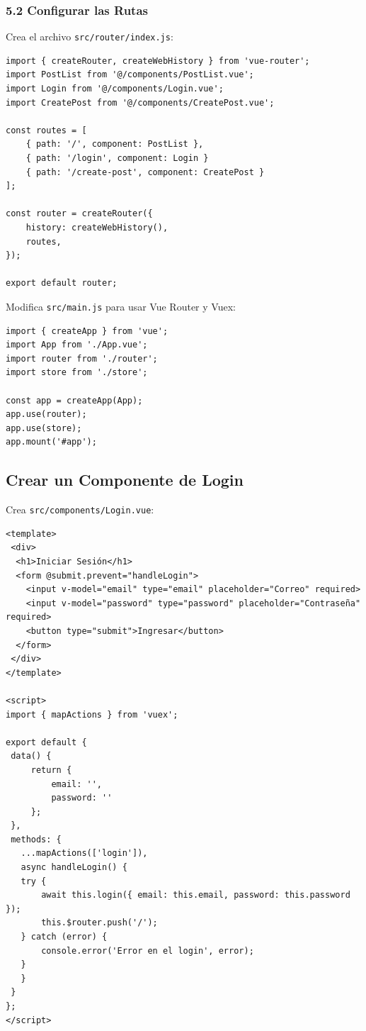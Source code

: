 \documentclass[11pt]{article}
\begin{document}
\subsubsection{5.2 Configurar las Rutas}
\label{sec:org251d928}
Crea el archivo \texttt{src/router/index.js}:

\begin{verbatim}
import { createRouter, createWebHistory } from 'vue-router';
import PostList from '@/components/PostList.vue';
import Login from '@/components/Login.vue';
import CreatePost from '@/components/CreatePost.vue';

const routes = [
    { path: '/', component: PostList },
    { path: '/login', component: Login }
    { path: '/create-post', component: CreatePost }
];

const router = createRouter({
    history: createWebHistory(),
    routes,
});

export default router;
\end{verbatim}

Modifica \texttt{src/main.js} para usar Vue Router y Vuex:

\begin{verbatim}
import { createApp } from 'vue';
import App from './App.vue';
import router from './router';
import store from './store';

const app = createApp(App);
app.use(router);
app.use(store);
app.mount('#app');
\end{verbatim}

\subsection{Crear un Componente de Login}
\label{sec:org200732a}

Crea \texttt{src/components/Login.vue}:

\begin{verbatim}
<template>
 <div>
  <h1>Iniciar Sesión</h1>
  <form @submit.prevent="handleLogin">
    <input v-model="email" type="email" placeholder="Correo" required>
    <input v-model="password" type="password" placeholder="Contraseña" required>
    <button type="submit">Ingresar</button>
  </form>
 </div>
</template>

<script>
import { mapActions } from 'vuex';

export default {
 data() {
     return {
         email: '',
         password: ''
     };
 },
 methods: {
   ...mapActions(['login']),
   async handleLogin() {
   try {
       await this.login({ email: this.email, password: this.password });
       this.$router.push('/');
   } catch (error) {
       console.error('Error en el login', error);
   }
   }
 }
};
</script>
\end{verbatim}
\end{document}
